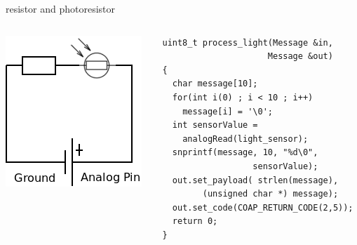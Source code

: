 \begin{frame}[containsverbatim]{resistor and photoresistor}
	\begin{columns}[c,onlytextwidth]
		\begin{column}[c]{.5\textwidth}
			\begin{center}
				\includegraphics [width=.9\textwidth,keepaspectratio]{img/resistor_photoresistor.png}
			\end{center}
		\end{column}
		\begin{column}[c]{.5\textwidth}
\begin{Verbatim}[fontsize=\scriptsize]
uint8_t process_light(Message &in, 
                     Message &out) 
{
  char message[10];
  for(int i(0) ; i < 10 ; i++)
    message[i] = '\0';
  int sensorValue = 
    analogRead(light_sensor);
  snprintf(message, 10, "%d\0", 
                  sensorValue);
  out.set_payload( strlen(message), 
        (unsigned char *) message);
  out.set_code(COAP_RETURN_CODE(2,5));
  return 0;
}
\end{Verbatim}
		\end{column}
	\end{columns}
\end{frame}


